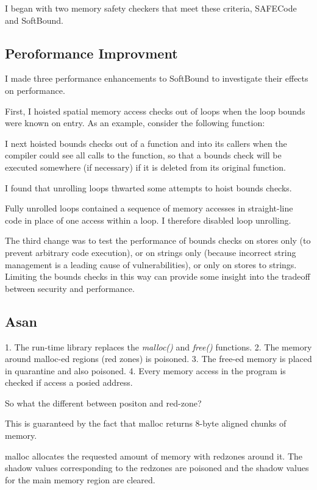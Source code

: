 
I began with two memory safety checkers that meet these criteria, SAFECode and SoftBound.

\subsection{Peroformance Improvment}

I made three performance enhancements to SoftBound to investigate their effects on performance.
~\cite{Performance of Compiler-Assisted Memory Safety Checking}

First, I hoisted spatial memory access checks out of loops when the loop bounds were known on entry. As an example, consider the following function:


I next hoisted bounds checks out of a function and into its callers when the compiler could see all calls to the function, so that a bounds check will be executed somewhere (if necessary) if it is deleted from its original function.

I found that unrolling loops thwarted some attempts to hoist bounds checks.

Fully unrolled loops contained a sequence of memory accesses in straight-line code in place of one access within a loop. I therefore disabled loop unrolling.

The third change was to test the performance of bounds checks on stores only (to prevent arbitrary code execution), or on strings only (because incorrect string management is a leading cause of vulnerabilities), or only on stores to strings. Limiting the bounds checks in this way can provide some insight into the tradeoff between security and performance.


\subsection{Asan}
1. The run-time library replaces the \textit{malloc()} and \textit{free()} functions.
2. The memory around malloc-ed regions (red zones) is poisoned.
3. The free-ed memory is placed in quarantine and also poisoned.
4. Every memory access in the program is checked if access a posied address.

So what the different between positon and red-zone?

This is guaranteed by the fact that malloc returns 8-byte aligned chunks of memory.

malloc allocates the requested amount of memory with redzones around it. The shadow values corresponding to the redzones are poisoned and the shadow values for the main memory region are cleared.

